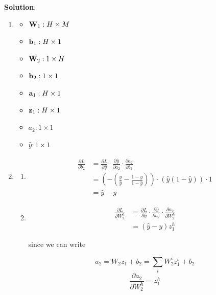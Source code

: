\documentclass[submit]{../harvardml}
\newenvironment{answer}{
    \vspace{2mm}
    \color{blue}\noindent\textbf{Solution}:
}{}
\begin{document}
\begin{answer}
  \begin{enumerate}
    \item \begin{itemize}
            \item $\bold{W}_1 : H\times M$
            \item $\bold{b}_1 : H \times 1$
            \item $\bold{W}_2 : 1\times H$
            \item $\bold{b}_2 : 1\times 1$
            \item $\bold{a}_1 : H\times 1$
            \item $\bold{z}_1 : H\times 1$
            \item $a_2 : 1\times 1$
            \item $\hat{y} : 1\times 1$
          \end{itemize}

    \item \begin{enumerate}
            \item
                  \begin{align*}
                    \frac {\partial L}{\partial b_2} & = \frac{\partial L}{\partial \hat{y}}\cdot \frac{\partial \hat{y}}{\partial a_2}\cdot\frac{\partial a_2}{\partial b_2} \\
                    &= \left(-\left(\frac{y}{\hat{y}}-\frac{1-y}{1-\hat{y}}\right)\right) \cdot (\hat{y}(1-\hat{y}))\cdot 1 \\
                    &= \boxed{\hat{y} - y}
                  \end{align*}

            \item
                  \begin{align*}
                    \frac {\partial L}{\partial W_2^h} & = \frac{\partial L}{\partial \hat{y}}\cdot \frac{\partial \hat{y}}{\partial a_2} \cdot \frac{\partial a_2}{\partial W_2^h} \\
                    &=\boxed{(\hat{y} - y)z_1^h}
                  \end{align*}

                  since we can write

                  \[
                  a_2 = W_2z_1 + b_2 = \sum_{i} W_2^iz_1^i + b_2
                  \]
                  \[
                  \frac{\partial a_2}{\partial W_2^h} = z_1^h
                  \]


\end{enumerate}
\end{enumerate}
\end{answer}
\end{document}
